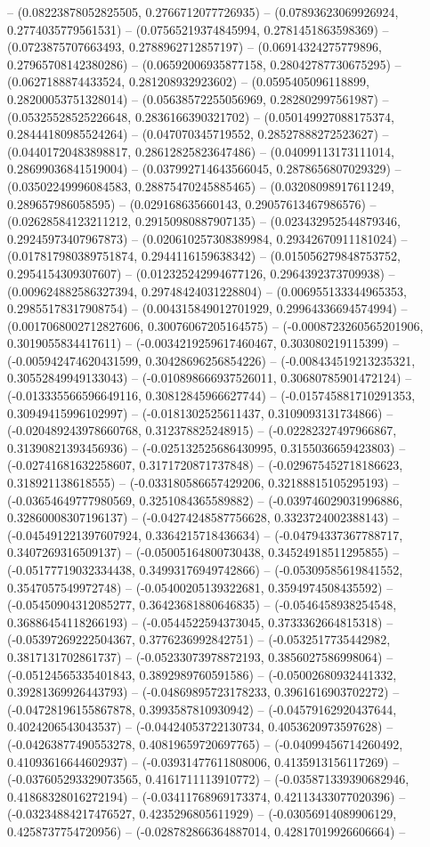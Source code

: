 -- (0.08223878052825505, 0.2766712077726935) -- (0.07893623069926924, 0.2774035779561531) -- (0.07565219374845994, 0.2781451863598369) -- (0.0723875707663493, 0.2788962712857197) -- (0.06914324275779896, 0.27965708142380286) -- (0.06592006935877158, 0.28042787730675295) -- (0.0627188874433524, 0.281208932923602) -- (0.0595405096118899, 0.28200053751328014) -- (0.05638572255056969, 0.282802997561987) -- (0.05325528525226648, 0.2836166390321702) -- (0.050149927088175374, 0.28444180985524264) -- (0.047070345719552, 0.28527888272523627) -- (0.04401720483898817, 0.28612825823647486) -- (0.04099113173111014, 0.28699036841519004) -- (0.037992714643566045, 0.2878656807029329) -- (0.03502249996084583, 0.28875470245885465) -- (0.03208098917611249, 0.289657986058595) -- (0.029168635660143, 0.29057613467986576) -- (0.02628584123211212, 0.29150980887907135) -- (0.023432952544879346, 0.29245973407967873) -- (0.020610257308389984, 0.29342670911181024) -- (0.017817980389751874, 0.2944116159638342) -- (0.015056279848753752, 0.2954154309307607) -- (0.012325242994677126, 0.2964392373709938) -- (0.009624882586327394, 0.29748424031228804) -- (0.006955133344965353, 0.29855178317908754) -- (0.004315849012701929, 0.29964336694574994) -- (0.0017068002712827606, 0.30076067205164575) -- (-0.0008723260565201906, 0.3019055834417611) -- (-0.0034219259617460467, 0.303080219115399) -- (-0.005942474620431599, 0.30428696256854226) -- (-0.008434519213235321, 0.30552849949133043) -- (-0.010898666937526011, 0.30680785901472124) -- (-0.013335566596649116, 0.30812845966627744) -- (-0.015745881710291353, 0.30949415996102997) -- (-0.0181302525611437, 0.3109093131734866) -- (-0.020489243978660768, 0.312378825248915) -- (-0.02282327497966867, 0.31390821393456936) -- (-0.025132525686430995, 0.3155036659423803) -- (-0.02741681632258607, 0.3171720871737848) -- (-0.029675452718186623, 0.318921138618555) -- (-0.033180586657429206, 0.32188815105295193) -- (-0.03654649777980569, 0.3251084365589882) -- (-0.039746029031996886, 0.32860008307196137) -- (-0.04274248587756628, 0.3323724002388143) -- (-0.045491221397607924, 0.3364215718436634) -- (-0.04794337367788717, 0.3407269316509137) -- (-0.05005164800730438, 0.34524918511295855) -- (-0.05177719032334438, 0.34993176949742866) -- (-0.05309585619841552, 0.3547057549972748) -- (-0.05400205139322681, 0.3594974508435592) -- (-0.05450904312085277, 0.36423681880646835) -- (-0.0546458938254548, 0.36886454118266193) -- (-0.0544522594373045, 0.3733362664815318) -- (-0.05397269222504367, 0.3776236992842751) -- (-0.0532517735442982, 0.3817131702861737) -- (-0.05233073978872193, 0.3856027586998064) -- (-0.05124565335401843, 0.3892989760591586) -- (-0.05002680932441332, 0.39281369926443793) -- (-0.04869895723178233, 0.3961616903702272) -- (-0.04728196155867878, 0.3993587810930942) -- (-0.04579162920437644, 0.4024206543043537) -- (-0.04424053722130734, 0.4053620973597628) -- (-0.04263877490553278, 0.40819659720697765) -- (-0.04099456714260492, 0.41093616644602937) -- (-0.03931477611808006, 0.4135913156117269) -- (-0.037605293329073565, 0.4161711113910772) -- (-0.035871339390682946, 0.41868328016272194) -- (-0.03411768969173374, 0.42113433077020396) -- (-0.03234884217476527, 0.4235296805611929) -- (-0.03056914089906129, 0.4258737754720956) -- (-0.028782866364887014, 0.42817019926606664) -- 